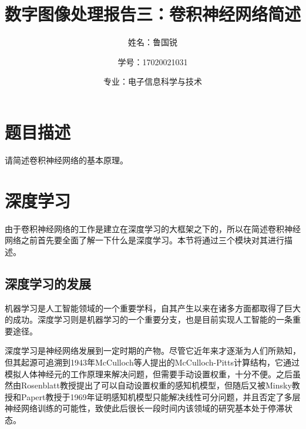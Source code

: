 \documentclass[UTF8]{ctexart}
\title{数字图像处理报告三：卷积神经网络简述}
\author{姓名：鲁国锐 \protect\newline
\and 学号：17020021031 \\
\and 专业：电子信息科学与技术}
\begin{document}
	\maketitle
	\renewcommand{\contentsname}{目录}
	\renewcommand{\listfigurename}{插图目录}
	\renewcommand{\listtablename}{表格目录}
	\renewcommand{\refname}{参考文献}
	\renewcommand{\abstractname}{摘要}
	\renewcommand{\indexname}{索引}
	\renewcommand{\tablename}{表}
	\renewcommand{\figurename}{图}
	
	
	
	\tableofcontents
	\newpage
	
	\hypersetup{
	bookmarks=true,
	colorlinks=true,
	linkcolor=red,
	urlcolor=blue
	}
	\section{题目描述}
	\indent 请简述卷积神经网络的基本原理。

%     


	
	\section{深度学习}\label{deeplearning}
        \indent 由于卷积神经网络的工作是建立在深度学习的大框架之下的，所以在简述卷积神经网络之前首先要全面了解一下什么是深度学习。本节将通过三个模块对其进行描述。
        \subsection{深度学习的发展}
            
    		\indent 机器学习是人工智能领域的一个重要学科，自其产生以来在诸多方面都取得了巨大的成功。深度学习则是机器学习的一个重要分支，也是目前实现人工智能的一条重要途径。
    		
    		\indent 深度学习是神经网络发展到一定时期的产物\cite{付文博2018深度学习原理及应用综述}。尽管它近年来才逐渐为人们所熟知，但其起源可追溯到1943年McCulloch等人\cite{Warren1943A}提出的McCulloch-Pitts计算结构，它通过模拟人体神经元的工作原理来解决问题，但需要手动设置权重，十分不便。之后虽然由Rosenblatt教授\cite{Rosenblatt1958Two}提出了可以自动设置权重的感知机模型，但随后又被Minsky教授和Papert教授于1969年证明感知机模型只能解决线性可分问题，并且否定了多层神经网络训练的可能性\cite{Casper1988Perceptrons}，致使此后很长一段时间内该领域的研究基本处于停滞状态。
    		
\end{document}
